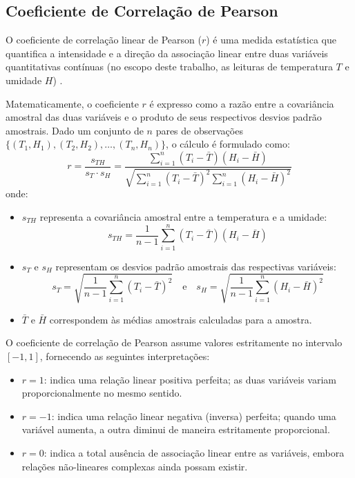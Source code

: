 \documentclass[
	12pt,
	openright,
	oneside,
	a4paper,
	english,
	brazil
	]{abntex2}
\begin{document}
\subsection{Coeficiente de Correlação de Pearson}

O coeficiente de correlação linear de Pearson ($r$) é uma medida estatística que quantifica a intensidade e a direção da associação linear entre duas variáveis quantitativas contínuas (no escopo deste trabalho, as leituras de temperatura $T$ e umidade $H$) \cite{pearson1895}.

Matematicamente, o coeficiente $r$ é expresso como a razão entre a covariância amostral das duas variáveis e o produto de seus respectivos desvios padrão amostrais. Dado um conjunto de $n$ pares de observações $\{(T_1, H_1), (T_2, H_2), \dots, (T_n, H_n)\}$, o cálculo é formulado como:
\begin{equation}
r = \frac{s_{TH}}{s_T \cdot s_H} = \frac{\sum_{i=1}^n (T_i - \bar{T})(H_i - \bar{H})}{\sqrt{\sum_{i=1}^n (T_i - \bar{T})^2 \sum_{i=1}^n (H_i - \bar{H})^2}}
\end{equation}
onde:
\begin{itemize}
    \item $s_{TH}$ representa a covariância amostral entre a temperatura e a umidade:
    \begin{equation}
    s_{TH} = \frac{1}{n - 1} \sum_{i=1}^n (T_i - \bar{T})(H_i - \bar{H})
    \end{equation}
    \item $s_T$ e $s_H$ representam os desvios padrão amostrais das respectivas variáveis:
    \begin{equation}
    s_T = \sqrt{\frac{1}{n - 1} \sum_{i=1}^n (T_i - \bar{T})^2} \quad \text{e} \quad s_H = \sqrt{\frac{1}{n - 1} \sum_{i=1}^n (H_i - \bar{H})^2}
    \end{equation}
    \item $\bar{T}$ e $\bar{H}$ correspondem às médias amostrais calculadas para a amostra.
\end{itemize}

O coeficiente de correlação de Pearson assume valores estritamente no intervalo $[-1, 1]$, fornecendo as seguintes interpretações:
\begin{itemize}
    \item $r = 1$: indica uma relação linear positiva perfeita; as duas variáveis variam proporcionalmente no mesmo sentido.
    \item $r = -1$: indica uma relação linear negativa (inversa) perfeita; quando uma variável aumenta, a outra diminui de maneira estritamente proporcional.
    \item $r = 0$: indica a total ausência de associação linear entre as variáveis, embora relações não-lineares complexas ainda possam existir.
\end{itemize}
\end{document}

